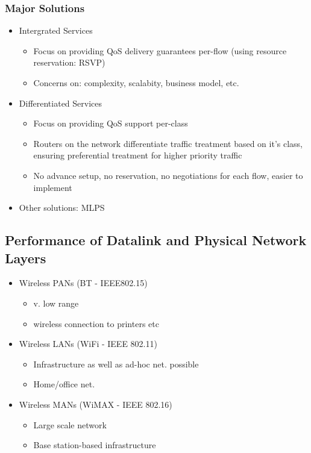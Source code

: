 \documentclass[a4paper]{article}
\begin{document}
\subsubsection{Major Solutions}
\begin{itemize}
	\item Intergrated Services
	\begin{itemize}
		\item Focus on providing QoS delivery guarantees per-flow (using
			resource reservation: RSVP)
		\item Concerns on: complexity, scalabity, business model, etc.
	\end{itemize}
	\item Differentiated Services
	\begin{itemize}
		\item Focus on providing QoS support per-class
		\item Routers on the network differentiate traffic treatment
			based on it's class, ensuring preferential treatment for
			higher priority traffic
		\item No advance setup, no reservation, no negotiations for each
			flow, easier to implement
	\end{itemize}
	\item Other solutions: MLPS
\end{itemize}
\subsection{Performance of Datalink and Physical Network Layers}
\begin{itemize}
	\item Wireless PANs (BT - IEEE802.15)
	\begin{itemize}
		\item v. low range
		\item wireless connection to printers etc
	\end{itemize}
	\item Wireless LANs (WiFi - IEEE 802.11)
	\begin{itemize}
		\item Infrastructure as well as ad-hoc net. possible
		\item Home/office net.
	\end{itemize}
	\item Wireless MANs (WiMAX - IEEE 802.16)
	\begin{itemize}
		\item Large scale network
		\item Base station-based infrastructure
	\end{itemize}
\end{itemize}
\end{document}

